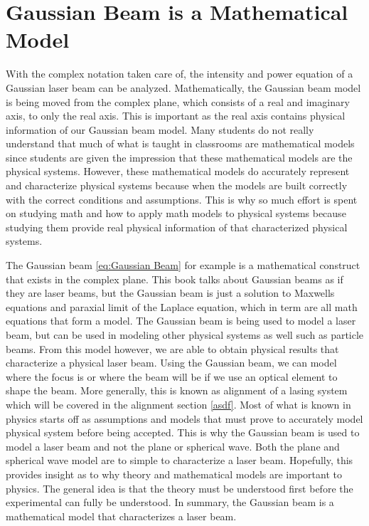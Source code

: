 \documentclass[11pt,a4paper]{book}
\begin{document}
	\section{Gaussian Beam is a Mathematical Model}
		\label{sec:Gaussian Beam Model}
		With the complex notation taken care of, the intensity and power equation of a Gaussian laser beam can be analyzed. Mathematically, the Gaussian beam model is being moved from the complex plane, which consists of a real and imaginary axis, to only the real axis. This is important as the real axis contains physical information of our Gaussian beam model. Many students do not really understand that much of what is taught in classrooms are mathematical models since students are given the impression that these mathematical models are the physical systems. However, these mathematical models do accurately represent and characterize physical systems because when the models are built correctly with the correct conditions and assumptions. This is why so much effort is spent on studying math and how to apply math models to physical systems because studying them provide real physical information of that characterized physical systems. 
		
		The Gaussian beam \autoref{eq:Gaussian Beam} for example is a mathematical construct that exists in the complex plane. This book talks about Gaussian beams as if they are laser beams, but the Gaussian beam is just a solution to Maxwells equations and paraxial limit of the Laplace equation, which in term are all math equations that form a model. The Gaussian beam is being used to model a laser beam, but can be used in modeling other physical systems as well such as particle beams. From this model however, we are able to obtain physical results that characterize a physical laser beam. Using the Gaussian beam, we can model where the focus is or where the beam will be if we use an optical element to shape the beam. More generally, this is known as alignment of a lasing system which will be covered in the alignment section \autoref{asdf}. Most of what is known in physics starts off as assumptions and models that must prove to accurately model physical system before being accepted. This is why the Gaussian beam is used to model a laser beam and not the plane or spherical wave. Both the plane and spherical wave model are to simple to characterize a laser beam. Hopefully, this provides insight as to why theory and mathematical models are important to physics. The general idea is that the theory must be understood first before the experimental can fully be understood. In summary, the Gaussian beam is a mathematical model that characterizes a laser beam.
		
\end{document}
